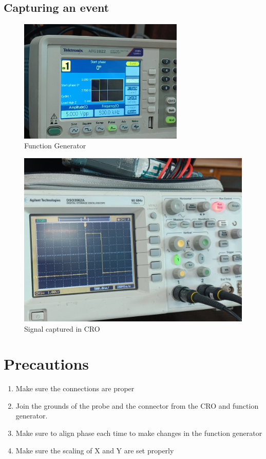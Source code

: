 \documentclass[journal]{IEEEtran}
\begin{document}
\subsection{Capturing an event}
\begin{figure}[H]
    \centering
    \includegraphics[width=0.7\textwidth]{pics/WhatsApp Image 2025-01-23 at 13.22.08.jpeg}
    \caption{Function Generator}
\end{figure}

\begin{figure}[H]
    \centering
    \includegraphics[width=0.7\columnwidth]{pics/WhatsApp Image 2025-01-23 at 13.22.10.jpeg}
    \caption{Signal captured in CRO}
\end{figure}

\section{Precautions}
\begin{enumerate}
    \item Make sure the connections are proper
    \item Join the grounds of the probe and the connector from the CRO and function generator.
    \item Make sure to align phase each time to make changes in the function generator
    \item Make sure the scaling of X and Y are set properly
\end{enumerate}
\end{document}
